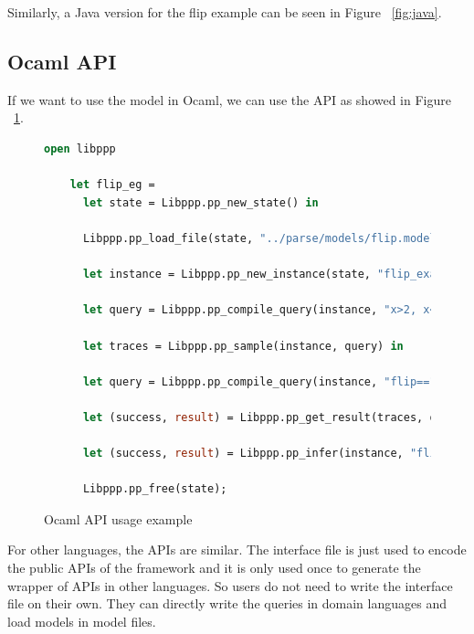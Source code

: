 Similarly, a Java version for the flip example can be seen in Figure ~\ref{fig:java}.\\

\subsection{Ocaml API}
If we want to use the model in Ocaml, we can use the API as showed in Figure ~\ref{fig:ocaml}. \\

\begin{figure}
  \begin{lstlisting}[language=Caml]
    open libppp

    let flip_eg =
      let state = Libppp.pp_new_state() in

      Libppp.pp_load_file(state, "../parse/models/flip.model")

      let instance = Libppp.pp_new_instance(state, "flip_example", None) in

      let query = Libppp.pp_compile_query(instance, "x>2, x<3") in

      let traces = Libppp.pp_sample(instance, query) in

      let query = Libppp.pp_compile_query(instance, "flip==1") in

      let (success, result) = Libppp.pp_get_result(traces, query) in

      let (success, result) = Libppp.pp_infer(instance, "flip == 1", "x > 2, x < 3") in

      Libppp.pp_free(state);
  \end{lstlisting}
  \caption{Ocaml API usage example}
  \label{fig:ocaml}
\end{figure}

For other languages, the APIs are similar. The interface file is just used to encode the public APIs of the framework and it is only used once to generate the wrapper of APIs in other languages. So users do not need to write the interface file on their own. They can directly write the queries in domain languages and load models in model files.
